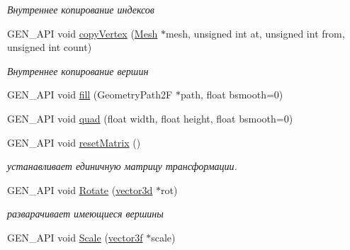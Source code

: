 \begin{DoxyCompactItemize}
\begin{DoxyCompactList}\small\item\em Внутреннее копирование индексов \end{DoxyCompactList}\item 
\hypertarget{classgen_1_1_modeller_mesh_aeace268c2b1f26dc42231577aa77ee8a}{G\-E\-N\-\_\-\-A\-P\-I void \hyperlink{classgen_1_1_modeller_mesh_aeace268c2b1f26dc42231577aa77ee8a}{copy\-Vertex} (\hyperlink{classcsad_1_1_mesh}{Mesh} $\ast$mesh, unsigned int at, unsigned int from, unsigned int count)}\label{classgen_1_1_modeller_mesh_aeace268c2b1f26dc42231577aa77ee8a}

\begin{DoxyCompactList}\small\item\em Внутреннее копирование вершин \end{DoxyCompactList}\item 
G\-E\-N\-\_\-\-A\-P\-I void \hyperlink{classgen_1_1_modeller_mesh_a35d7e7c91979cd64f6fa1b7146e6a724}{fill} (Geometry\-Path2\-F $\ast$path, float bsmooth=0)
\item 
G\-E\-N\-\_\-\-A\-P\-I void \hyperlink{classgen_1_1_modeller_mesh_a18758d6962ed3b34eaf9c8fabc2ef371}{quad} (float width, float height, float bsmooth=0)
\item 
\hypertarget{classgen_1_1_modeller_mesh_a688df921a9895224753ec4a7fd095ae7}{G\-E\-N\-\_\-\-A\-P\-I void \hyperlink{classgen_1_1_modeller_mesh_a688df921a9895224753ec4a7fd095ae7}{reset\-Matrix} ()}\label{classgen_1_1_modeller_mesh_a688df921a9895224753ec4a7fd095ae7}

\begin{DoxyCompactList}\small\item\em устанавливает единичную матрицу трансформации. \end{DoxyCompactList}\item 
\hypertarget{classgen_1_1_modeller_mesh_a67054bfc7fd92c96727b8e63daf2e613}{G\-E\-N\-\_\-\-A\-P\-I void \hyperlink{classgen_1_1_modeller_mesh_a67054bfc7fd92c96727b8e63daf2e613}{Rotate} (\hyperlink{classbt_1_1vector3d}{vector3d} $\ast$rot)}\label{classgen_1_1_modeller_mesh_a67054bfc7fd92c96727b8e63daf2e613}

\begin{DoxyCompactList}\small\item\em разварачивает имеющиеся вершины \end{DoxyCompactList}\item 
\hypertarget{classgen_1_1_modeller_mesh_ada4d30f9ddb5f163ad4f9fb2c3f7846d}{G\-E\-N\-\_\-\-A\-P\-I void \hyperlink{classgen_1_1_modeller_mesh_ada4d30f9ddb5f163ad4f9fb2c3f7846d}{Scale} (\hyperlink{classbt_1_1vector3f}{vector3f} $\ast$scale)}\label{classgen_1_1_modeller_mesh_ada4d30f9ddb5f163ad4f9fb2c3f7846d}


\end{DoxyCompactItemize}
